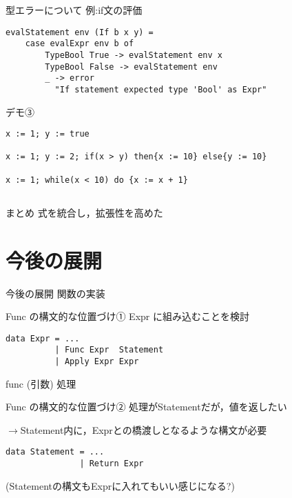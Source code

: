 \documentclass[uplatex,dvipdfmx,ja=standard]{beamer}
\begin{document}
\begin{frame}[fragile]{型エラーについて}
    例:if文の評価

    \begin{verbatim}
evalStatement env (If b x y) = 
    case evalExpr env b of 
        TypeBool True -> evalStatement env x
        TypeBool False -> evalStatement env
        _ -> error 
          "If statement expected type 'Bool' as Expr" 
    \end{verbatim}

\end{frame}

\begin{frame}[fragile]{デモ③}
    \begin{verbatim}
x := 1; y := true

x := 1; y := 2; if(x > y) then{x := 10} else{y := 10}

x := 1; while(x < 10) do {x := x + 1}
    \end{verbatim}
\end{frame}

\subsection{}

\begin{frame}{まとめ}
    式を統合し，拡張性を高めた
\end{frame}


\section{今後の展開}
\begin{frame}{今後の展開}
    関数の実装
\end{frame}

\begin{frame}[fragile]{Func の構文的な位置づけ①}
    Expr に組み込むことを検討
    \begin{verbatim}
data Expr = ...
          | Func Expr  Statement
          | Apply Expr Expr
    \end{verbatim}
    func (引数) 処理
\end{frame}

\begin{frame}[fragile]{Func の構文的な位置づけ②}
    処理がStatementだが，値を返したい

    $\to$Statement内に，Exprとの橋渡しとなるような構文が必要

    \begin{verbatim}
data Statement = ...
               | Return Expr 
    \end{verbatim}
    (Statementの構文もExprに入れてもいい感じになる?)
\end{frame}
\end{document}

